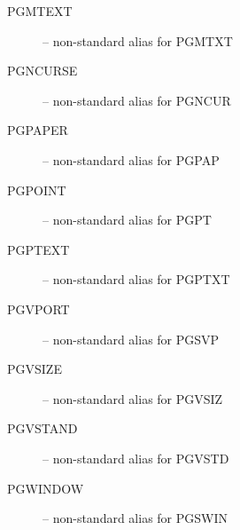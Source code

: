\begin{description}
\item[PGMTEXT] -- non-standard alias for PGMTXT
\item[PGNCURSE] -- non-standard alias for PGNCUR
\item[PGPAPER] -- non-standard alias for PGPAP
\item[PGPOINT] -- non-standard alias for PGPT
\item[PGPTEXT] -- non-standard alias for PGPTXT
\item[PGVPORT] -- non-standard alias for PGSVP
\item[PGVSIZE] -- non-standard alias for PGVSIZ
\item[PGVSTAND] -- non-standard alias for PGVSTD
\item[PGWINDOW] -- non-standard alias for PGSWIN
\end{description}
 
